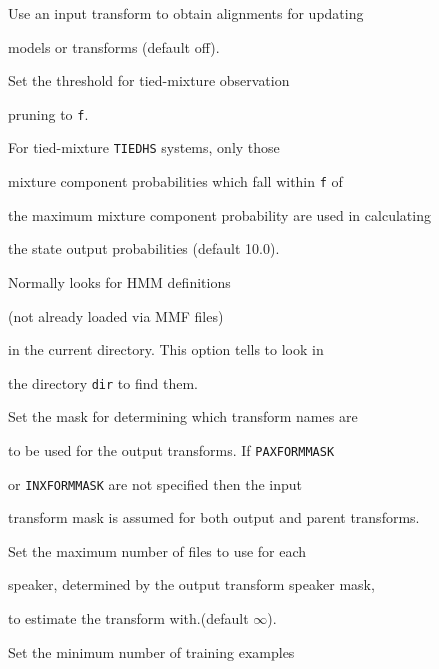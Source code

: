 \begin{optlist}





   Use an input transform to obtain alignments for updating


      models or transforms (default off).


 


   Set the threshold for tied-mixture observation


      pruning to {\tt f}.


      For tied-mixture \texttt{TIEDHS} systems, only those 


      mixture component probabilities which fall within {\tt f} of


      the maximum mixture component probability are used in calculating


      the state output probabilities (default 10.0).


 




      Normally  looks for HMM definitions


       (not already loaded via MMF files) 


      in the current directory.  This option tells  to look in


      the directory {\tt dir} to find them.





   Set the mask for determining which transform names are 


	to be used for the output transforms. If \texttt{PAXFORMMASK}


       	or \texttt{INXFORMMASK} are not specified then the input


  	transform mask is assumed for both output and parent transforms.





   Set the maximum number of files to use for each 


	speaker, determined by the output transform speaker mask,


	to estimate the transform with.(default $\infty$).





    Set the minimum number of training examples 



\end{optlist}
